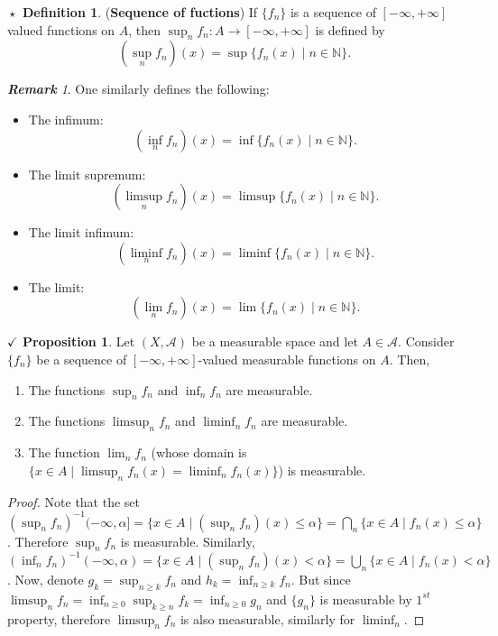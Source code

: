 \documentclass{article}
\theoremstyle{definition}
\newtheorem{definition}{$\boxed{\star}$ Definition}
\theoremstyle{remark}
\newtheorem*{remark}{\textbf{Remark}}
\theoremstyle{definition}
\theoremstyle{definition}
\newtheorem{proposition}{$\checkmark$ Proposition}
\theoremstyle{definition}
\newcommand{\bunion}{\bigcup}
\newcommand{\bintrs}{\bigcap}
\newcommand{\where}{\;\vert\;}
\newcommand{\N}{\mathbb{N}}
\newcommand{\alg}[1]{\mathscr{#1}}
\newcommand{\inv}[1]{{#1}^{-1}}
\begin{document}
\hrulefill
\begin{definition}
	(\textbf{Sequence of fuctions}) If $ \{f_n\} $ is a sequence of $ [-\infty,+\infty] $ valued functions on $ A $, then $ \sup_{n} f_n : A \to [-\infty,+\infty]$ is defined by
	\[\left (\sup_{n} f_n\right )(x) = \sup\{f_n(x)\where n \in \N\}.\]
\end{definition}
\begin{remark}
	One similarly defines the following:
	\begin{itemize}
		\item {The infimum:
	\[\left (\inf_{n} f_n\right )(x) = \inf\{f_n(x)\where n \in \N\}.\]	
	}
\item {The limit supremum:
\[\left (\limsup_{n} f_n\right )(x) = \limsup\{f_n(x)\where n \in \N\}.\]
}
\item {The limit infimum:
\[\left (\liminf_{n} f_n\right )(x) = \liminf\{f_n(x)\where n \in \N\}.\]
}
\item {The limit:
\[\left (\lim_{n} f_n\right )(x) = \lim\{f_n(x)\where n \in \N\}.\]
}
	\end{itemize}
\end{remark}
\hrulefill
\begin{proposition}\label{P-20}
	Let $ (X,\alg{A}) $ be a measurable space and let $ A\in \alg{A} $. Consider $ \{f_n\} $ be a sequence of $ [-\infty,+\infty] $-valued measurable functions on $ A $. Then,
	\begin{enumerate}
		\item {The functions $ \sup_{n}f_n $ and $ \inf_n f_n $ are measurable.}
		\item {The functions $ \limsup_{n}f_n $ and $ \liminf_{n} f_n$ are measurable.}
		\item {The function $ \lim_{n} f_n $ (whose domain is $ \{x\in A \where \limsup_nf_n(x) = \liminf_nf_n(x)\} $) is measurable.}
	\end{enumerate}
\end{proposition}
\begin{proof}
	Note that the set $ \inv{(\sup_{n}f_n)}(-\infty,\alpha] = \{x\in A\where (\sup_n f_n)(x) \le \alpha\} = \bintrs_n \{x\in A \where f_n(x)\le \alpha\}$. Therefore $ \sup_n f_n $ is measurable. Similarly, $ \inv{(\inf_n f_n)}(-\infty,\alpha)  = \{x\in A \where (\sup_nf_n)(x) <\alpha\} = \bunion_n \{x\in A\where f_n(x)<\alpha\}$. Now, denote $ g_k = \sup_{n\ge k}f_n $ and $ h_k = \inf_{n\ge k}f_n $. But since $ \limsup_{n} f_n = \inf_{n\ge 0} \sup_{k\ge n} f_k = \inf_{n\ge 0} g_n$ and $ \{g_n\} $ is measurable by $ 1^{st} $ property, therefore $ \limsup_{n} f_n $ is also measurable, similarly for $ \liminf_{n} $.
\end{proof}
\hrulefill
\newpage
\end{document}
